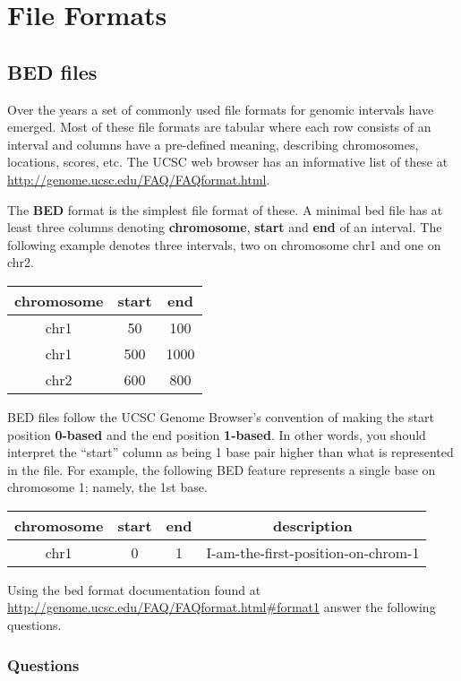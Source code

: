 \documentclass[11pt]{article}
\begin{document}
    \hypertarget{file-formats}{%
\section{File Formats}\label{file-formats}}

\hypertarget{bed-files}{%
\subsection{BED files}\label{bed-files}}

Over the years a set of commonly used file formats for genomic intervals
have emerged. Most of these file formats are tabular where each row
consists of an interval and columns have a pre-defined meaning,
describing chromosomes, locations, scores, etc. The UCSC web browser has
an informative list of these at
\url{http://genome.ucsc.edu/FAQ/FAQformat.html}.

The \textbf{BED} format is the simplest file format of these. A minimal
bed file has at least three columns denoting \textbf{chromosome},
\textbf{start} and \textbf{end} of an interval. The following example
denotes three intervals, two on chromosome chr1 and one on chr2.

    \begin{longtable}[]{@{}ccc@{}}
\hline
chromosome & start & end\tabularnewline
\hline
\endhead
chr1 & 50 & 100\tabularnewline
chr1 & 500 & 1000\tabularnewline
chr2 & 600 & 800\tabularnewline
\hline
\end{longtable}

    BED files follow the UCSC Genome Browser's convention of making the
start position \textbf{0-based} and the end position \textbf{1-based}.
In other words, you should interpret the ``start'' column as being 1
base pair higher than what is represented in the file. For example, the
following BED feature represents a single base on chromosome 1; namely,
the 1st base.

    \begin{longtable}[]{@{}cccc@{}}
\hline
chromosome & start & end & description\tabularnewline
\hline
\endhead
chr1 & 0 & 1 & I-am-the-first-position-on-chrom-1\tabularnewline
\hline
\end{longtable}

    Using the bed format documentation found at
\url{http://genome.ucsc.edu/FAQ/FAQformat.html\#format1} answer the
following questions.

    \hypertarget{questions}{%
\subsubsection{Questions}\label{questions}}
\end{document}
